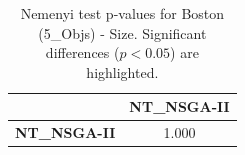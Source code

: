 \begin{table}[h!]
\centering
\scriptsize
\begin{tabular}{lc}
\toprule
 & NT\_NSGA-II \\
\midrule
\textbf{NT\_NSGA-II} & 1.000 \\
\bottomrule
\end{tabular}
\caption{Nemenyi test p-values for Boston (5_Objs) - Size. Significant differences ($p < 0.05$) are highlighted.}
\label{tab:nemenyi_nemenyi_Boston_5_Objs_Test_Size}
\end{table}